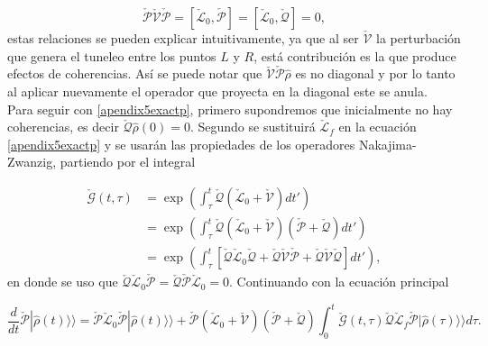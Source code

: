 \begin{appendixs}
\begin{equation*}
    \check{\mathcal{P}}\check{\mathcal{V}}\check{\mathcal{P}} = [\check{\mathcal{L}}_0,\check{\mathcal{P}}] = [\check{\mathcal{L}}_0,\check{\mathcal{Q}}] = 0, 
\end{equation*}
estas relaciones se pueden explicar intuitivamente, ya que al ser $\check{\mathcal{V}}$ la perturbación que genera el tuneleo entre los puntos $L$ y $R$, está contribución es la que produce efectos de coherencias. Así se puede notar que $\check{\mathcal{V}}\check{\mathcal{P}}\hat{\rho}$ es no diagonal y por lo tanto al aplicar nuevamente el operador que proyecta en la diagonal este se anula.
\\
Para seguir con \ref{apendix5exactp}, primero supondremos que inicialmente no hay coherencias, es decir $\check{\mathcal{Q}}\hat{\rho}(0) = 0$. Segundo se sustituirá $\check{\mathcal{L}}_{f}$ en la ecuación \ref{apendix5exactp} y se usarán las propiedades de los operadores Nakajima-Zwanzig, partiendo por el integral

\begin{align*}
    \check{\mathcal{G}}(t,\tau) & = \exp\left(  \int_{\tau}^{t}\check{\mathcal{Q}}(\check{\mathcal{L}}_{0} + \check{\mathcal{V}})dt' \right) \\
        & = \exp\left(  \int_{\tau}^{t}\check{\mathcal{Q}}(\check{\mathcal{L}}_{0}+\check{\mathcal{V}})(\check{\mathcal{P}}+\check{\mathcal{Q}}) dt' \right) \\
            & = \exp\left(  \int_{\tau}^{t}\left[\check{\mathcal{Q}}\check{\mathcal{L}}_{0}\check{\mathcal{Q}}+ \check{\mathcal{Q}}\check{\mathcal{V}}\check{\mathcal{P}}+\check{\mathcal{Q}}\check{\mathcal{V}}\check{\mathcal{Q}}\right] dt' \right),       
\end{align*}
en donde se uso que $\check{\mathcal{Q}}\check{\mathcal{L}}_{0}\check{\mathcal{P}} = \check{\mathcal{Q}}\check{\mathcal{P}}\check{\mathcal{L}}_{0}=0$. Continuando con la ecuación principal

\begin{equation*}
    \frac{d}{dt}\check{\mathcal{P}}|\hat{\rho}(t)\rangle \rangle = \check{\mathcal{P}}\check{\mathcal{L}}_{0}\check{\mathcal{P}}|\hat{\rho}(t)\rangle \rangle + \check{\mathcal{P}}(\check{\mathcal{L}}_{0} + \check{\mathcal{V}})(\check{\mathcal{P}}+\check{\mathcal{Q}})\int_{0}^{t}\check{\mathcal{G}}(t,\tau)\check{\mathcal{Q}}\check{\mathcal{L}}_{f} \check{\mathcal{P}}|\hat{\rho}(\tau)\rangle \rangle d\tau.       
\end{equation*}


\end{appendixs}
